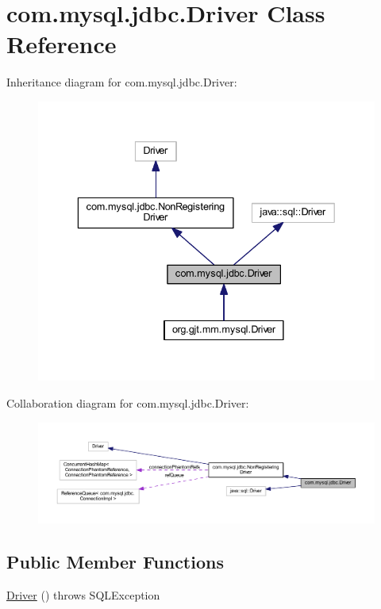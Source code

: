 \hypertarget{classcom_1_1mysql_1_1jdbc_1_1_driver}{}\section{com.\+mysql.\+jdbc.\+Driver Class Reference}
\label{classcom_1_1mysql_1_1jdbc_1_1_driver}


Inheritance diagram for com.\+mysql.\+jdbc.\+Driver\+:
\nopagebreak
\begin{figure}[H]
\begin{center}
\leavevmode
\includegraphics[width=336pt]{classcom_1_1mysql_1_1jdbc_1_1_driver__inherit__graph}
\end{center}
\end{figure}


Collaboration diagram for com.\+mysql.\+jdbc.\+Driver\+:
\nopagebreak
\begin{figure}[H]
\begin{center}
\leavevmode
\includegraphics[width=350pt]{classcom_1_1mysql_1_1jdbc_1_1_driver__coll__graph}
\end{center}
\end{figure}
\subsection*{Public Member Functions}
\begin{DoxyCompactItemize}
\item 
\mbox{\hyperlink{classcom_1_1mysql_1_1jdbc_1_1_driver_a55d93610188df37d4699e34b19519728}{Driver}} ()  throws S\+Q\+L\+Exception 
\end{DoxyCompactItemize}
